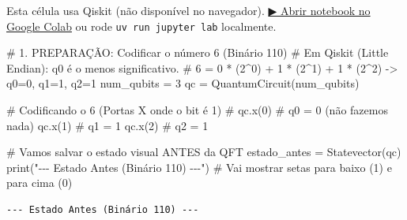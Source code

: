 \documentclass[
  brazilian,
]{report}
\newenvironment{Shaded}{\begin{snugshade}}{\end{snugshade}}
\newcommand{\BuiltInTok}[1]{\textcolor[rgb]{0.00,0.23,0.31}{#1}}
\newcommand{\CommentTok}[1]{\textcolor[rgb]{0.37,0.37,0.37}{#1}}
\newcommand{\DecValTok}[1]{\textcolor[rgb]{0.68,0.00,0.00}{#1}}
\newcommand{\NormalTok}[1]{\textcolor[rgb]{0.00,0.23,0.31}{#1}}
\newcommand{\OperatorTok}[1]{\textcolor[rgb]{0.37,0.37,0.37}{#1}}
\newcommand{\StringTok}[1]{\textcolor[rgb]{0.13,0.47,0.30}{#1}}
\begin{document}
\begin{tcolorbox}[enhanced jigsaw, arc=.35mm, bottomrule=.15mm, bottomtitle=1mm, breakable, colback=white, colbacktitle=quarto-callout-warning-color!10!white, colframe=quarto-callout-warning-color-frame, coltitle=black, left=2mm, leftrule=.75mm, opacityback=0, opacitybacktitle=0.6, rightrule=.15mm, title=\textcolor{quarto-callout-warning-color}{\faExclamationTriangle}\hspace{0.5em}{⚛️ Célula Qiskit --- execute no Colab ou localmente}, titlerule=0mm, toprule=.15mm, toptitle=1mm]

Esta célula usa Qiskit (não disponível no navegador).
\href{https://colab.research.google.com/github/maxwellamaral/aula-quantum/blob/main/notebooks/07-quantum-fourier-transform.ipynb}{▶
Abrir notebook no Google Colab} ou rode \texttt{uv\ run\ jupyter\ lab}
localmente.

\begin{Shaded}
\begin{Highlighting}[]


\CommentTok{\# 1. PREPARAÇÃO: Codificar o número 6 (Binário 110)}
\CommentTok{\# Em Qiskit (Little Endian): q0 é o menos significativo.}
\CommentTok{\# 6 = 0 * (2\^{}0) + 1 * (2\^{}1) + 1 * (2\^{}2) {-}\textgreater{} q0=0, q1=1, q2=1}
\NormalTok{num\_qubits }\OperatorTok{=} \DecValTok{3}
\NormalTok{qc }\OperatorTok{=}\NormalTok{ QuantumCircuit(num\_qubits)}

\CommentTok{\# Codificando o \textquotesingle{}6\textquotesingle{} (Portas X onde o bit é 1)}
\CommentTok{\# qc.x(0) \# q0 = 0 (não fazemos nada)}
\NormalTok{qc.x(}\DecValTok{1}\NormalTok{) }\CommentTok{\# q1 = 1}
\NormalTok{qc.x(}\DecValTok{2}\NormalTok{) }\CommentTok{\# q2 = 1}

\CommentTok{\# Vamos salvar o estado visual ANTES da QFT}
\NormalTok{estado\_antes }\OperatorTok{=}\NormalTok{ Statevector(qc)}
\BuiltInTok{print}\NormalTok{(}\StringTok{"{-}{-}{-} Estado Antes (Binário 110) {-}{-}{-}"}\NormalTok{)}
\CommentTok{\# Vai mostrar setas para baixo (1) e para cima (0)}
\end{Highlighting}
\end{Shaded}

\end{tcolorbox}

\begin{verbatim}
--- Estado Antes (Binário 110) ---
\end{verbatim}
\end{document}
